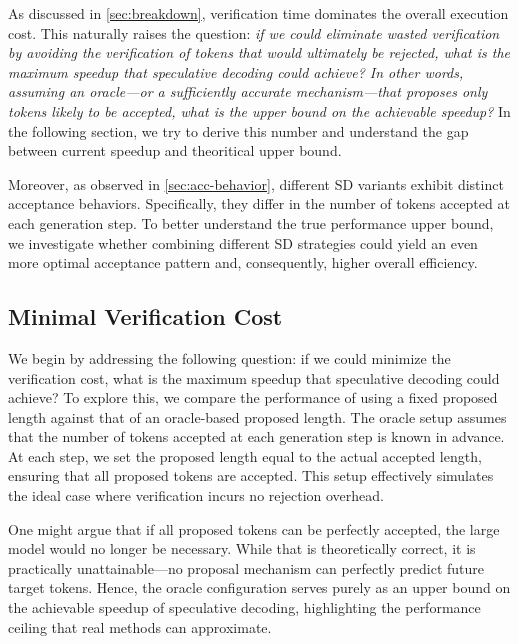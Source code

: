 As discussed in \autoref{sec:breakdown}, verification time dominates the overall execution cost. This naturally raises the question: \emph{if we could eliminate wasted verification by avoiding the verification of tokens that would ultimately be rejected, what is the maximum speedup that speculative decoding could achieve?
In other words, assuming an oracle—or a sufficiently accurate mechanism—that proposes only tokens likely to be accepted, what is the upper bound on the achievable speedup?} In the following section, we try to derive this number and understand the gap between current speedup and theoritical upper bound.

Moreover, as observed in \autoref{sec:acc-behavior}, different SD variants exhibit distinct acceptance behaviors. Specifically, they differ in the number of tokens accepted at each generation step. To better understand the true performance upper bound, we investigate whether combining different SD strategies could yield an even more optimal acceptance pattern and, consequently, higher overall efficiency. 




\subsection{Minimal Verification Cost}
We begin by addressing the following question: if we could minimize the verification cost, what is the maximum speedup that speculative decoding could achieve? To explore this, we compare the performance of using a fixed proposed length against that of an oracle-based proposed length. The oracle setup assumes that the number of tokens accepted at each generation step is known in advance. At each step, we set the proposed length equal to the actual accepted length, ensuring that all proposed tokens are accepted. This setup effectively simulates the ideal case where verification incurs no rejection overhead.

One might argue that if all proposed tokens can be perfectly accepted, the large model would no longer be necessary. While that is theoretically correct, it is practically unattainable—no proposal mechanism can perfectly predict future target tokens. Hence, the oracle configuration serves purely as an upper bound on the achievable speedup of speculative decoding, highlighting the performance ceiling that real methods can approximate.

